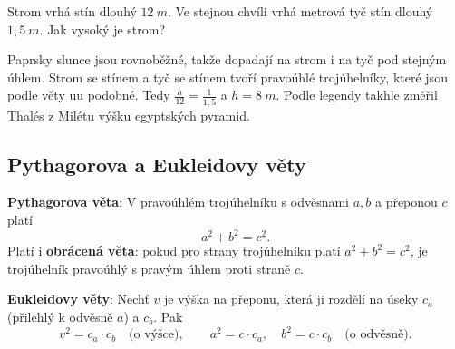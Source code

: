 \begin{example}
  Strom vrhá stín dlouhý $12\ \si{m}$. Ve stejnou chvíli vrhá metrová tyč stín dlouhý $1{,}5\ \si{m}$. Jak vysoký je strom?

  Paprsky slunce jsou rovnoběžné, takže dopadají na strom i na tyč pod stejným úhlem. Strom se stínem a tyč se stínem tvoří pravoúhlé trojúhelníky, které jsou podle věty uu podobné. Tedy $\frac{h}{12} = \frac{1}{1{,}5}$ a $h = 8\ \si{m}$. Podle legendy takhle změřil Thalés z Milétu výšku egyptských pyramid.
  \begin{center}
  \end{center}
\end{example}

\subsection{Pythagorova a Eukleidovy věty}\label{sec:pythagorova-veta}

\begin{definitionbox}
  \textbf{Pythagorova věta}: V pravoúhlém trojúhelníku s odvěsnami $a, b$ a přeponou $c$ platí
  \begin{equation*}
    a^2 + b^2 = c^2.
  \end{equation*}
  Platí i \textbf{obrácená věta}: pokud pro strany trojúhelníku platí $a^2 + b^2 = c^2$, je trojúhelník pravoúhlý s pravým úhlem proti straně $c$.

  \vspace{0.2cm}

  \textbf{Eukleidovy věty}: Nechť $v$ je výška na přeponu, která ji rozdělí na úseky $c_a$ (přilehlý k odvěsně $a$) a $c_b$. Pak
  \begin{equation*}
    v^2 = c_a\cdot c_b\quad\text{(o výšce)},\qquad a^2 = c\cdot c_a,\quad b^2 = c\cdot c_b\quad\text{(o odvěsně)}.
  \end{equation*}
\end{definitionbox}

